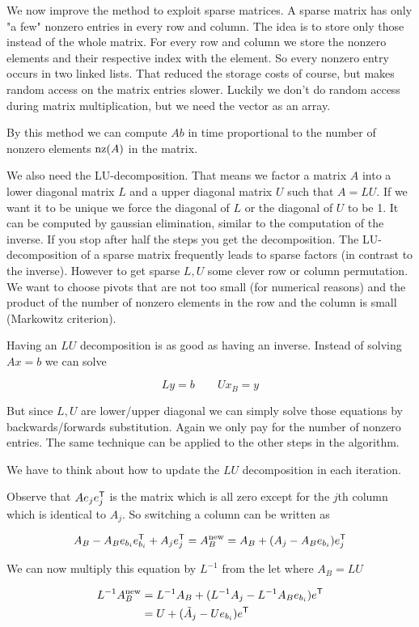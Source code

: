 We now improve the method to exploit sparse matrices. A sparse matrix has only "a few" nonzero entries in every row and column. The idea is to store only those instead of the whole matrix. For every row and column we store the nonzero elements and their respective index with the element. So every nonzero entry occurs in two linked lists. That reduced the storage costs of course, but makes random access on the matrix entries slower. Luckily we don't do random access during matrix multiplication, but we need the vector as an array. 

By this method we can compute $Ab$ in time proportional to the number of nonzero elements $\text{nz}(A)$ in the matrix.

We also need the LU-decomposition. That means we factor a matrix $A$ into a lower diagonal matrix $L$ and a upper diagonal matrix $U$ such that $A=LU$. If we want it to be unique we force the diagonal of $L$ or the diagonal of $U$ to be 1. It can be computed by gaussian elimination, similar to the computation of the inverse. If you stop after half the steps you get the decomposition. The LU-decomposition of a sparse matrix frequently leads to sparse factors (in contrast to the inverse). However to get sparse $L,U$ some clever row or column permutation. We want to choose pivots that are not too small (for numerical reasons) and the product of the number of nonzero elements in the row and the column is small (Markowitz criterion).

Having an $LU$ decomposition is as good as having an inverse. Instead of solving $Ax=b$ we can solve

\[Ly=b\qquad Ux_B=y\]

But since $L,U$ are lower/upper diagonal we can simply solve those equations by backwards/forwards substitution. Again we only pay for the number of nonzero entries. The same technique can be applied to the other steps in the algorithm.

We have to think about how to update the $LU$ decomposition in each iteration.

Observe that $Ae_j{e}^\text{\upshape \sffamily T}_j$ is the matrix which is all zero except for the $j$th column which is identical to $A_j$. So switching a column can be written as

\[A_B-A_Be_{b_i}{e}^\text{\upshape \sffamily T}_{b_i} + A_j{e}^\text{\upshape \sffamily T}_j =A_B^{\text{new}} = A_B+(A_j-A_Be_{b_i}){e}^\text{\upshape \sffamily T}_j\]

We can now multiply this equation by $L^{-1}$ from the let where $A_B=LU$

\begin{align*}
L^{-1}A_B^{\text{new}} &= L^{-1}A_B+(L^{-1}A_j - L^{-1}A_Be_{b_i}){e}^\text{\upshape \sffamily T}\\
&= U+(\tilde A_j - Ue_{b_i}){e}^\text{\upshape \sffamily T}
\end{align*}

